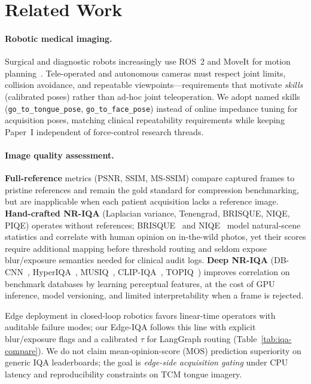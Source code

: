 \section{Related Work}
\label{sec:related}

\paragraph{Robotic medical imaging.}
Surgical and diagnostic robots increasingly use ROS~2 and MoveIt for motion planning~\cite{moore2021ros2,chitta2009moveit}.
Tele-operated and autonomous cameras must respect joint limits, collision avoidance, and repeatable viewpoints---requirements that motivate \emph{skills} (calibrated poses) rather than ad-hoc joint teleoperation.
We adopt named skills (\texttt{go\_to\_tongue\_pose}, \texttt{go\_to\_face\_pose}) instead of online impedance tuning for acquisition poses, matching clinical repeatability requirements while keeping Paper~I independent of force-control research threads.

\paragraph{Image quality assessment.}
\textbf{Full-reference} metrics (PSNR, SSIM, MS-SSIM) compare captured frames to pristine references and remain the gold standard for compression benchmarking, but are inapplicable when each patient acquisition lacks a reference image.
\textbf{Hand-crafted NR-IQA} (Laplacian variance, Tenengrad, BRISQUE, NIQE, PIQE) operates without references; BRISQUE~\cite{mittal2012brisque} and NIQE~\cite{mittal2012niqe} model natural-scene statistics and correlate with human opinion on in-the-wild photos, yet their scores require additional mapping before threshold routing and seldom expose blur/exposure semantics needed for clinical audit logs.
\textbf{Deep NR-IQA} (DB-CNN~\cite{zhang2018blind}, HyperIQA~\cite{su2020hyperiqa}, MUSIQ~\cite{ke2021musiq}, CLIP-IQA~\cite{wang2023clipiqa}, TOPIQ~\cite{chen2024topiq}) improves correlation on benchmark databases by learning perceptual features, at the cost of GPU inference, model versioning, and limited interpretability when a frame is rejected.

Edge deployment in closed-loop robotics favors linear-time operators with auditable failure modes; our Edge-IQA follows this line with explicit blur/exposure flags and a calibrated $\tau$ for LangGraph routing (Table~\ref{tab:iqa-compare}).
We do not claim mean-opinion-score (MOS) prediction superiority on generic IQA leaderboards; the goal is \emph{edge-side acquisition gating} under CPU latency and reproducibility constraints on TCM tongue imagery.

